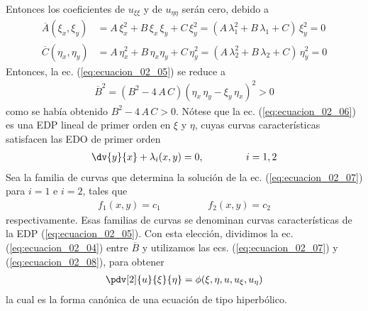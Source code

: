 Entonces los coeficientes de $u_{\xi \xi}$ y de $u_{\eta \eta}$ serán cero, debido a
\begin{align*}
\overline{A} (\xi_{x}, \xi_{y}) &= A \, \xi_{x}^{2} + B \, \xi_{x} \, \xi_{y} + C \, \xi_{y}^{2} = (A \, \lambda_{1}^{2} + B \, \lambda_{1} + C ) \, \xi_{y}^{2} = 0 \\[1em]
\overline{C} (\eta_{x}, \eta_{y}) &= A \, \eta_{x}^{2} + B \, \eta_{x} \eta_{y} + C \, \eta_{y}^{2} = (A \, \lambda_{2}^{2} + B \, \lambda_{2} + C ) \, \eta_{y}^{2} = 0
\end{align*}
Entonces, la ec. (\ref{eq:ecuacion_02_05}) se reduce a
\begin{align*}
\overline{B}^{2} = (B^{2} - 4 \, A \, C) (\eta_{x} \, \eta_{y} - \xi_{y} \, \eta_{x})^{2} > 0
\end{align*}
como se había obtenido $B^{2} - 4 \, A \, C > 0$. Nótese que la ec. (\ref{eq:ecuacion_02_06}) es una EDP lineal de primer orden en $\xi$ y $\eta$, cuyas curvas características satisfacen las EDO de primer orden
\begin{align}
\dv{y}{x} + \lambda_{i} (x, y) = 0, \hspace{1.5cm} i = 1, 2
\label{eq:ecuacion_02_07}    
\end{align}
Sea la familia de curvas que determina la solución de la ec. (\ref{eq:ecuacion_02_07}) para $i = 1$ e $i = 2$, tales que
\begin{align}
f_{1} (x, y) = c_{1} \hspace{2cm} f_{2}(x, y) = c_{2}
\label{eq:ecuacion_02_08}
\end{align}
respectivamente. Esas familias de curvas se denominan curvas características de la EDP (\ref{eq:ecuacion_02_05}). Con esta elección, dividimos la ec. (\ref{eq:ecuacion_02_04}) entre $\overline{B}$ y utilizamos las ecs. (\ref{eq:ecuacion_02_07}) y (\ref{eq:ecuacion_02_08}), para obtener
\begin{align}
\pdv[2]{u}{\xi}{\eta} = \phi (\xi, \eta, u, u_{\xi}, u_{\eta})
\label{eq:ecuacion_02_09}
\end{align}
la cual es la forma canónica de una ecuación de tipo hiperbólico.
